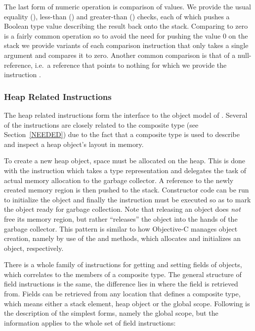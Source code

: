 The last form of numeric operation is comparison of values. We provide the usual
equality (), less-than () and
greater-than () checks, each of which pushes a Boolean
type value describing the result back onto the stack. Comparing to zero is a
fairly common operation so to avoid the need for pushing the value $0$ on the
stack we provide variants of each comparison instruction that only takes a
single argument and compares it to zero. Another common comparison is that of a
null-reference, i.e.~a reference that points to nothing for which we provide the
instruction .

\subsubsection{Heap Related Instructions}

The heap related instructions form the interface to the object model of
\thename{}. Several of the instructions are closely related to the composite
type (see Section~\ref{NEEDED}) due to the fact that a composite type is used to
describe and inspect a heap object's layout in memory.

To create a new heap object, space must be allocated on the heap. This is done
with the  instruction which takes a type representation and delegates
the task of actual memory allocation to the garbage collector. A reference to
the newly created memory region is then pushed to the stack. Constructor code
can be run to initialize the object and finally the  instruction
must be executed so as to mark the object ready for garbage collection. Note
that releasing an object does \emph{not} free its memory region, but rather
``releases'' the object into the hands of the garbage collector. This pattern is
similar to how Objective-C manages object creation, namely by use of the
 and  methods, which allocates and initializes an object,
respectively.

There is a whole family of instructions for getting and setting fields of
objects, which correlates to the members of a composite type. The general
structure of field instructions is the same, the difference lies in where the
field is retrieved from. Fields can be retrieved from any location that defines
a composite type, which means either a stack element, heap object or the global
scope. Following is the description of the simplest forms, namely the global
scope, but the information applies to the whole set of field instructions:

